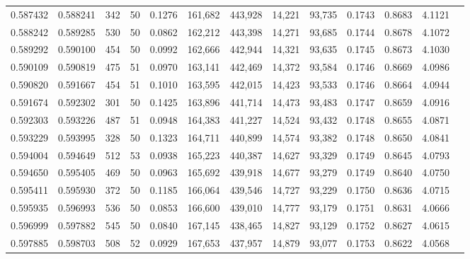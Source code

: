 \begin{tabular}{rrrrrrrrrrrrr}
0.587432 & 0.588241 &   342 &  50 &                                     0.1276 & 161,682 & 443,928 &  14,221 &  93,735 & 0.1743 & 0.8683 & 4.1121 \\
0.588242 & 0.589285 &   530 &  50 &                                     0.0862 & 162,212 & 443,398 &  14,271 &  93,685 & 0.1744 & 0.8678 & 4.1072 \\
0.589292 & 0.590100 &   454 &  50 &                                     0.0992 & 162,666 & 442,944 &  14,321 &  93,635 & 0.1745 & 0.8673 & 4.1030 \\
0.590109 & 0.590819 &   475 &  51 &                                     0.0970 & 163,141 & 442,469 &  14,372 &  93,584 & 0.1746 & 0.8669 & 4.0986 \\
0.590820 & 0.591667 &   454 &  51 &                                     0.1010 & 163,595 & 442,015 &  14,423 &  93,533 & 0.1746 & 0.8664 & 4.0944 \\
0.591674 & 0.592302 &   301 &  50 &                                     0.1425 & 163,896 & 441,714 &  14,473 &  93,483 & 0.1747 & 0.8659 & 4.0916 \\
0.592303 & 0.593226 &   487 &  51 &                                     0.0948 & 164,383 & 441,227 &  14,524 &  93,432 & 0.1748 & 0.8655 & 4.0871 \\
0.593229 & 0.593995 &   328 &  50 &                                     0.1323 & 164,711 & 440,899 &  14,574 &  93,382 & 0.1748 & 0.8650 & 4.0841 \\
0.594004 & 0.594649 &   512 &  53 &                                     0.0938 & 165,223 & 440,387 &  14,627 &  93,329 & 0.1749 & 0.8645 & 4.0793 \\
0.594650 & 0.595405 &   469 &  50 &                                     0.0963 & 165,692 & 439,918 &  14,677 &  93,279 & 0.1749 & 0.8640 & 4.0750 \\
0.595411 & 0.595930 &   372 &  50 &                                     0.1185 & 166,064 & 439,546 &  14,727 &  93,229 & 0.1750 & 0.8636 & 4.0715 \\
0.595935 & 0.596993 &   536 &  50 &                                     0.0853 & 166,600 & 439,010 &  14,777 &  93,179 & 0.1751 & 0.8631 & 4.0666 \\
0.596999 & 0.597882 &   545 &  50 &                                     0.0840 & 167,145 & 438,465 &  14,827 &  93,129 & 0.1752 & 0.8627 & 4.0615 \\
0.597885 & 0.598703 &   508 &  52 &                                     0.0929 & 167,653 & 437,957 &  14,879 &  93,077 & 0.1753 & 0.8622 & 4.0568 \\

\end{tabular}
